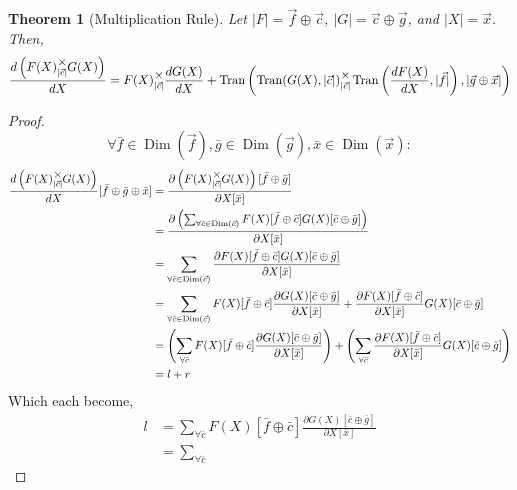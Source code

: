 \documentclass[12pt]{book}
\theoremstyle{plain}
\newtheorem{theorem}{Theorem}[chapter]
\theoremstyle{definition}
\theoremstyle{ppart}
\theoremstyle{case}
\theoremstyle{solution}
\DeclareMathOperator{\Dim}{Dim}
\DeclareMathOperator{\Tran}{Tran}
\newcommand{\mmult}[1]{\text{\raisebox{1ex}{$\underset{#1}{\times}$}}}
\begin{document}
\begin{landscape}
\begin{theorem}[Multiplication Rule]
\label{multiplication_rule}
Let $|F| = \vec{f} \oplus \vec{c}$, $|G| = \vec{c} \oplus \vec{g}$,
and $|X| = \vec{x}$. Then,
\begin{align*}
 \frac{d\left(F(X) \mmult{|\vec{c}|} G(X)\right)}{dX} =
 F(X) \mmult{|\vec{c}|} \frac{dG(X)}{dX} +
 \Tran\left(
   \Tran(G(X), |\vec{c}|)
     \mmult{|\vec{c}|}
   \Tran\left(\frac{dF(X)}{dX}, |\vec{f}|\right),
   |\vec{g} \oplus \vec{x}|
 \right)
\end{align*}
\end{theorem}
\begin{proof}
\[
 \forall
  \bar{f} \in \Dim(\vec{f}),
  \bar{g} \in \Dim(\vec{g}),
  \bar{x} \in \Dim(\vec{x})
 :
\]
\begin{align*}
 \frac{d\left(F(X) \mmult{|\vec{c}|} G(X)\right)}{dX}
  [\bar{f} \oplus \bar{g} \oplus \bar{x}]
 &= \frac{
       \partial \left(F(X) \mmult{|\vec{c}|} G(X)\right)[\bar{f} \oplus \bar{g}]
    }{
       \partial X[\bar{x}]
    } \\
 &= \frac{
       \partial \left(
        \sum_{\forall \bar{c} \in \Dim(\vec{c})}
         F(X)[\bar{f} \oplus \bar{c}] G(X)[\bar{c} \oplus \bar{g}]
      \right)
    }{
       \partial X[\bar{x}]
    } \\
 &= \sum_{\forall \bar{c} \in \Dim(\vec{c})}
    \frac{
      \partial F(X)[\bar{f} \oplus \bar{c}] G(X)[\bar{c} \oplus \bar{g}]
    }{
      \partial X[\bar{x}]
    }\\
 &= \sum_{\forall \bar{c} \in \Dim(\vec{c})}
    F(X)[\bar{f} \oplus \bar{c}]
    \frac{\partial G(X)[\bar{c} \oplus \bar{g}]}{\partial X[\bar{x}]}
    +
    \frac{\partial F(X)[\bar{f} \oplus \bar{c}]}{\partial X[\bar{x}]}
    G(X)[\bar{c} \oplus \bar{g}] \\
 &=
   \left(
    \sum_{\forall \bar{c}}
      F(X)[\bar{f} \oplus \bar{c}]
      \frac{\partial G(X)[\bar{c} \oplus \bar{g}]}{\partial X[\bar{x}]}
   \right)
   +
   \left(
    \sum_{\forall \bar{c}}
      \frac{\partial F(X)[\bar{f} \oplus \bar{c}]}{\partial X[\bar{x}]}
      G(X)[\bar{c} \oplus \bar{g}]
   \right) \\
 &=
    l + r
\end{align*}
Which each become,
\begin{align*}
 l
 &=
  \sum_{\forall \bar{c}}
    F(X)[\bar{f} \oplus \bar{c}]
    \frac{\partial G(X)[\bar{c} \oplus \bar{g}]}{\partial X[\bar{x}]} \\
 &=
  \sum_{\forall \bar{c}}

\end{align*}
\end{proof}
\end{landscape}
\end{document}
